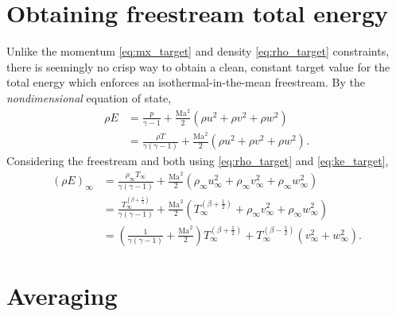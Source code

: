 \documentclass[letterpaper,11pt,nointlimits,reqno]{amsart}
\newcommand{\Mach}[1][]{\ensuremath{\mbox{Ma}_{#1}}}
\begin{document}
\section{Obtaining freestream total energy}

Unlike the momentum \eqref{eq:mx_target} and density \eqref{eq:rho_target}
constraints, there is seemingly no crisp way to obtain a clean, constant target
value for the total energy which enforces an isothermal-in-the-mean freestream.
By the \emph{nondimensional} equation of state,
\begin{align}
  \rho E &= \frac{p}{\gamma-1}
          + \frac{\Mach^2}{2}\left(\rho{}u^2 + \rho{}v^2 + \rho{}w^2\right)
\\
         &= \frac{\rho T}{\gamma\left(\gamma-1\right)}
          + \frac{\Mach^2}{2}\left(\rho{}u^2 + \rho{}v^2 + \rho{}w^2\right)
.
\end{align}
Considering the freestream and both using \eqref{eq:rho_target} and
\eqref{eq:ke_target},
\begin{align}
  \left(\rho E\right)_\infty
         &= \frac{\rho_\infty T_\infty}{\gamma\left(\gamma-1\right)}
          + \frac{\Mach^2}{2}\left(  \rho_\infty u_\infty^2
                                   + \rho_\infty v_\infty^2
                                   + \rho_\infty w_\infty^2\right)
\\
         &= \frac{T_\infty^{\left(\beta+\frac{1}{2}\right)}}{\gamma\left(\gamma-1\right)}
          + \frac{\Mach^2}{2}\left(  T_\infty^{\left(\beta+\frac{1}{2}\right)}
                                   + \rho_\infty v_\infty^2
                                   + \rho_\infty w_\infty^2\right)
\\
\label{eq:e_target}
         &= \left(  \frac{1}{\gamma\left(\gamma-1\right)}
                  + \frac{\Mach^2}{2} \right)
             T_\infty^{\left(\beta+\frac{1}{2}\right)}
          +
             T_\infty^{\left(\beta-\frac{1}{2}\right)}
             \left(v_\infty^2 + w_\infty^2\right)
.
\end{align}

\section{Averaging}
\end{document}
